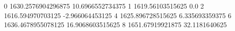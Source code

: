0 1630.2576904296875 10.6966552734375
1 1619.56103515625 0.0
2 1616.594970703125 -2.966064453125
4 1625.896728515625 6.335693359375
6 1636.4678955078125 16.9068603515625
8 1651.67919921875 32.1181640625
